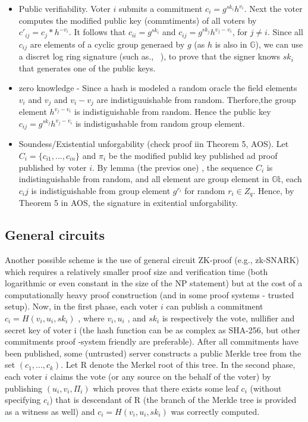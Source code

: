 \documentclass[]{article}
\begin{document}
		\begin{itemize}
			\item Public verifiability.  Voter $i$ submits a commitment $c_i = g^{sk_i}h^{v_i}$.
			Next the voter computes the modified public key (commtiments) of all voters by $c'_{ij} = c_{j}*h^{-v_i}$. It follows that $c_{ii} = g^{sk_i}$ and $c_{ij} = g^{sk_j}h^{v_j-v_i}$, for $j \neq i$.
			Since all $c_{ij}$ are elements of a cyclic group generaed by $g$ (as $h$ is also in $\mathbb{G}$), we can use a discret log ring signature (such as., ~\cite{AOS}), to prove that the signer knows $sk_i$ that generates one of the public keys.
			\item zero knowledge  - 	Since a hash is modeled a random oracle the field elements $v_i$ and $v_j$ and $v_i-v_j$ are indistiguuishable from random. Therfore,the group element  $h^{v_j-v_i}$ is indistiguishable from random. Hence the  public key $c_{ij}=  g^{sk_j}h^{v_j-v_i}$ is indistigushable from random group element.	 
			\item Soundess/Existential unforgability (check proof iin Theorem 5, AOS). Let $C_i= \{c_{i1},...,c_{in}\}$ and $\pi_i$ be the modified publid key published ad proof published by voter $i$. By lemma (the previos one) , the sequence $C_i$ is indistinguishable from random, and all element are group element in $\mathbb{Gt}$, each $c_ij$ is indistiguishable from group element $g^{r_i}$ for random $r_i\in Z_q$. Hence, by Theorem 5 in AOS, the signature in exitential unforgability.
		\end{itemize}
		
		\subsection{General circuits}
		Another possible scheme is the use of general circuit ZK-proof (e.g., zk-SNARK) which requires a relatively smaller proof size and verification time (both logarithmic or even constant in the size of the NP statement) but at the cost of a computationally heavy  proof construction (and in some proof systems - trusted setup).
		Now, in the first phase, each voter $i$ can publish a commitment $c_i = H(v_i,u_i,sk_i)$   , where $v_i, u_i$ , and $sk_i$ is respectively the vote, nullifier and secret key of voter i  (the hash function can be as complex as SHA-256, but other commitments proof -system friendly are preferable). After all commitments have been published, some (untrusted) server constructs a public Merkle tree from the set $(c_1,...,c_k)$. Let R denote the Merkel root of this tree. 
		In the second phase, each voter $i$ claims the vote (or any source on the behalf of the voter) by publishing $(u_i, v_i,\Pi_i)$ which proves that there exists some leaf $c_i$ (without specifying  $c_i$) that is descendant of R (the branch of the Merkle tree is provided as a witness as well) and $c_i = H(v_i,u_i,sk_i)$ was correctly computed. 
		
\end{document}
